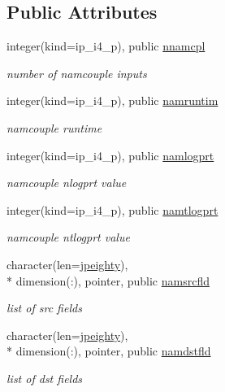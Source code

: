 \subsection*{Public Attributes}
\begin{DoxyCompactItemize}
\item 
integer(kind=ip\+\_\+i4\+\_\+p), public \hyperlink{classmod__oasis__namcouple_a5ca7cd6a5b9f939b68492200aa92bab4}{nnamcpl}
\begin{DoxyCompactList}\small\item\em number of namcouple inputs \end{DoxyCompactList}\item 
integer(kind=ip\+\_\+i4\+\_\+p), public \hyperlink{classmod__oasis__namcouple_a14505eaa91b2c8ba308c63ff78652206}{namruntim}
\begin{DoxyCompactList}\small\item\em namcouple runtime \end{DoxyCompactList}\item 
integer(kind=ip\+\_\+i4\+\_\+p), public \hyperlink{classmod__oasis__namcouple_a46affda5336f60a1eeb1badaaccd3cfd}{namlogprt}
\begin{DoxyCompactList}\small\item\em namcouple nlogprt value \end{DoxyCompactList}\item 
integer(kind=ip\+\_\+i4\+\_\+p), public \hyperlink{classmod__oasis__namcouple_a45fbbd2941f5d71991d409f63e31cf02}{namtlogprt}
\begin{DoxyCompactList}\small\item\em namcouple ntlogprt value \end{DoxyCompactList}\item 
character(len=\hyperlink{classmod__oasis__namcouple_a4fb10ad6e864dcbe34c4a8b02204a523}{jpeighty}), \\*
dimension(\+:), pointer, public \hyperlink{classmod__oasis__namcouple_a5fcb5a4f2a49f414fafe38b03c5c089d}{namsrcfld}
\begin{DoxyCompactList}\small\item\em list of src fields \end{DoxyCompactList}\item 
character(len=\hyperlink{classmod__oasis__namcouple_a4fb10ad6e864dcbe34c4a8b02204a523}{jpeighty}), \\*
dimension(\+:), pointer, public \hyperlink{classmod__oasis__namcouple_ac4cfec209e4169b6098f9a8b9be1ffb1}{namdstfld}
\begin{DoxyCompactList}\small\item\em list of dst fields \end{DoxyCompactList}\item 

\end{DoxyCompactItemize}
